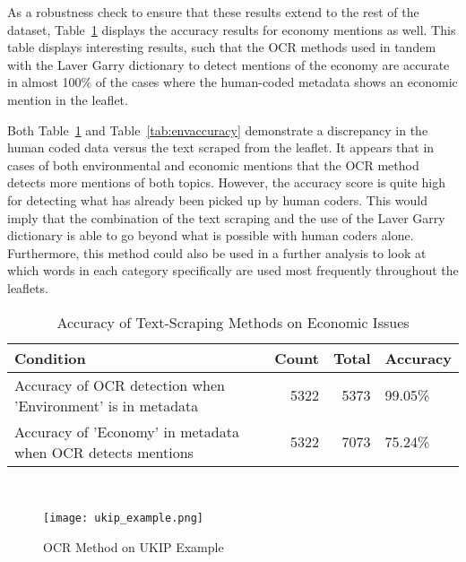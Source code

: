 \documentclass[12pt,letterpaper]{article}
\begin{document}
\vspace{0.5cm}

As a robustness check to ensure that these results extend to the rest of the dataset, Table~\ref{tab:econaccuracy} displays the accuracy results for economy mentions as well. This table displays interesting results, such that the OCR methods used in tandem with the Laver Garry dictionary \autocite{laverEstimatingPolicyPositions2000} to detect mentions of the economy are accurate in almost 100\% of the cases where the human-coded metadata shows an economic mention in the leaflet. 

Both Table~\ref{tab:econaccuracy} and Table~\ref{tab:envaccuracy} demonstrate a discrepancy in the human coded data versus the text scraped from the leaflet. It appears that in cases of both environmental and economic mentions that the OCR method detects more mentions of both topics. However, the accuracy score is quite high for detecting what has already been picked up by human coders. This would imply that the combination of the text scraping and the use of the Laver Garry dictionary is able to go beyond what is possible with human coders alone. Furthermore, this method could also be used in a further analysis to look at which words in each category specifically are used most frequently throughout the leaflets. 


\vspace{1cm}

\begin{table}[!htbp] 
	\centering 
	\captionsetup{justification=centering} %
	\caption{Accuracy of Text-Scraping Methods on Economic Issues} 
	\label{tab:econaccuracy} 
	\begin{tabular}{lrrl}
		\toprule
		Condition & Count & Total & Accuracy \\
		\midrule
		Accuracy of OCR detection when 'Environment' is in metadata & 5322 & 5373 & 99.05\% \\
		Accuracy of 'Economy' in metadata when OCR detects mentions & 5322 & 7073 & 75.24\% \\
		\bottomrule
	\end{tabular}\\
\end{table}


\vspace{1cm}





\begin{wrapfigure}[35]{l}{0.58\textwidth}
	\centering
	\texttt{[image: ukip\_example.png]}
	\caption{OCR Method on UKIP Example}
	\label{fig:ukip_example}
\end{wrapfigure}
\end{document}
